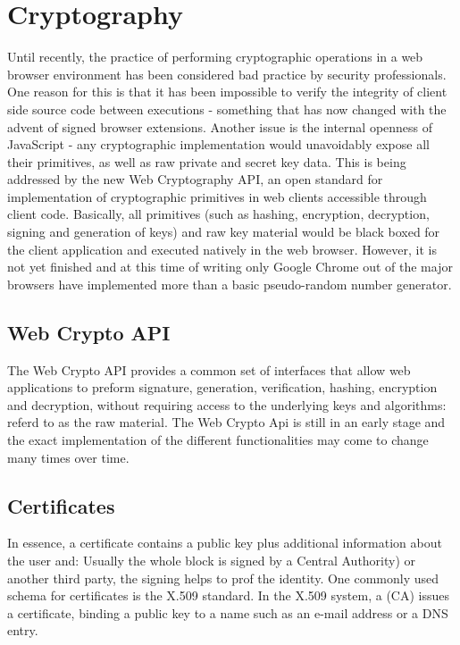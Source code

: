 \section{Cryptography}
Until recently, the practice of performing cryptographic operations in a web browser environment has been considered bad practice by security professionals\cite{Matasano:Online}. One reason for this is that it has been impossible to verify the integrity of client side source code between executions - something that has now changed with the advent of signed browser extensions. Another issue is the internal openness of JavaScript - any cryptographic implementation would unavoidably expose all their primitives, as well as raw private and secret key data. This is being addressed by the new Web Cryptography API\cite{WebCrypto:Online}, an open standard for implementation of cryptographic primitives in web clients accessible through client code. Basically, all primitives (such as hashing, encryption, decryption, signing and generation of keys) and raw key material would be black boxed for the client application and executed natively in the web browser. However, it is not yet finished and at this time of writing only Google Chrome out of the major browsers have implemented more than a basic pseudo-random number generator.

\subsection{Web Crypto API}
The Web Crypto API provides a common set of interfaces that allow web applications to preform signature, generation, verification, hashing, encryption and decryption, without requiring access to the underlying keys and algorithms: referd to as the raw material. The Web Crypto Api is still in an early stage and the exact implementation of the different functionalities may come to change many times over time.

\subsection{Certificates}
In essence, a certificate contains a public key plus additional information about the user and: Usually the whole block is signed by a Central Authority) or another third party, the signing helps to prof the identity. One commonly used schema for certificates is the X.509 standard. In the X.509 system, a (CA) issues a certificate, binding a public key to a name such as an e-mail address or a DNS entry.

